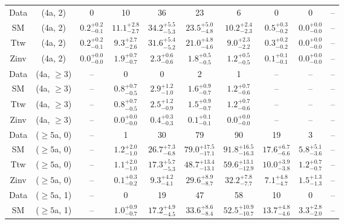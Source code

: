 \begin{table}[h!]
{\begin{tabular}{cccccccccc}
	Data & (4a, 2) & 0 & 10 & 36 & 23 & 6 & 0 & 0 & -- \\[0.5ex] 
	SM & (4a, 2) & $0.2^{+ 0.2 }_{- 0.1 }$ & $11.1^{+ 2.8 }_{- 2.7 }$ & $34.2^{+ 5.5 }_{- 5.3 }$ & $23.5^{+ 5.0 }_{- 4.8 }$ & $10.2^{+ 2.4 }_{- 2.3 }$ & $0.5^{+ 0.3 }_{- 0.2 }$ & $0.0^{+ 0.0 }_{- 0.0 }$ & -- \\[0.5ex] 
	Ttw & (4a, 2) & $0.2^{+ 0.2 }_{- 0.1 }$ & $9.3^{+ 2.7 }_{- 2.6 }$ & $31.6^{+ 5.4 }_{- 5.2 }$ & $21.0^{+ 4.8 }_{- 4.6 }$ & $9.0^{+ 2.3 }_{- 2.2 }$ & $0.3^{+ 0.2 }_{- 0.2 }$ & $0.0^{+ 0.0 }_{- 0.0 }$ & -- \\[0.5ex] 
	Zinv & (4a, 2) & $0.0^{+ 0.0 }_{- 0.0 }$ & $1.9^{+ 0.7 }_{- 0.7 }$ & $2.3^{+ 0.6 }_{- 0.6 }$ & $1.8^{+ 0.5 }_{- 0.5 }$ & $1.2^{+ 0.5 }_{- 0.5 }$ & $0.1^{+ 0.1 }_{- 0.1 }$ & $0.0^{+ 0.0 }_{- 0.0 }$ & -- \\[0.5ex] 
	Data & (4a, $\ge3$) & -- & 0 & 0 & 2 & 1 & -- & -- & -- \\[0.5ex] 
	SM & (4a, $\ge3$) & -- & $0.8^{+ 0.7 }_{- 0.5 }$ & $2.9^{+ 1.2 }_{- 1.0 }$ & $1.6^{+ 0.9 }_{- 0.7 }$ & $1.2^{+ 0.7 }_{- 0.6 }$ & -- & -- & -- \\[0.5ex] 
	Ttw & (4a, $\ge3$) & -- & $0.8^{+ 0.7 }_{- 0.5 }$ & $2.5^{+ 1.2 }_{- 0.9 }$ & $1.5^{+ 0.9 }_{- 0.7 }$ & $1.2^{+ 0.7 }_{- 0.6 }$ & -- & -- & -- \\[0.5ex] 
	Zinv & (4a, $\ge3$) & -- & $0.0^{+ 0.0 }_{- 0.0 }$ & $0.4^{+ 0.3 }_{- 0.3 }$ & $0.1^{+ 0.1 }_{- 0.1 }$ & $0.0^{+ 0.0 }_{- 0.0 }$ & -- & -- & -- \\[0.5ex] 
	Data & ($\ge5$a, 0) & -- & 1 & 30 & 79 & 90 & 19 & 3 & -- \\[0.5ex] 
	SM & ($\ge5$a, 0) & -- & $1.2^{+ 2.0 }_{- 1.0 }$ & $26.7^{+ 7.3 }_{- 6.8 }$ & $79.0^{+ 17.5 }_{- 17.1 }$ & $91.8^{+ 16.5 }_{- 16.3 }$ & $17.6^{+ 6.7 }_{- 6.6 }$ & $5.8^{+ 5.1 }_{- 3.6 }$ & -- \\[0.5ex] 
	Ttw & ($\ge5$a, 0) & -- & $1.1^{+ 2.0 }_{- 1.0 }$ & $17.3^{+ 5.7 }_{- 5.3 }$ & $48.7^{+ 13.4 }_{- 13.1 }$ & $59.6^{+ 13.1 }_{- 12.9 }$ & $10.0^{+ 3.9 }_{- 3.8 }$ & $1.2^{+ 0.7 }_{- 0.7 }$ & -- \\[0.5ex] 
	Zinv & ($\ge5$a, 0) & -- & $0.1^{+ 0.3 }_{- 0.2 }$ & $9.3^{+ 4.2 }_{- 4.1 }$ & $29.6^{+ 8.9 }_{- 8.7 }$ & $32.2^{+ 7.8 }_{- 7.7 }$ & $7.1^{+ 4.8 }_{- 4.7 }$ & $1.5^{+ 1.3 }_{- 1.3 }$ & -- \\[0.5ex] 
	Data & ($\ge5$a, 1) & -- & 0 & 19 & 47 & 58 & 10 & 0 & -- \\[0.5ex] 
	SM & ($\ge5$a, 1) & -- & $1.0^{+ 0.9 }_{- 0.7 }$ & $17.2^{+ 4.9 }_{- 4.5 }$ & $33.6^{+ 8.6 }_{- 8.4 }$ & $52.5^{+ 10.9 }_{- 10.7 }$ & $13.7^{+ 4.8 }_{- 4.6 }$ & $3.3^{+ 2.8 }_{- 2.0 }$ & -- \\[0.5ex] 

\end{tabular}}
\end{table}
